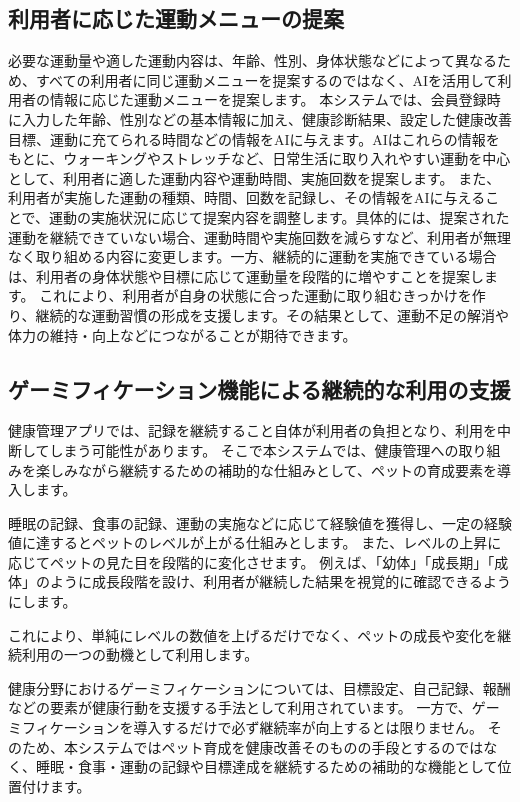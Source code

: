 \documentclass[uplatex,dvipdfmx]{jlreq}
\begin{document}
\subsection{利用者に応じた運動メニューの提案}
必要な運動量や適した運動内容は、年齢、性別、身体状態などによって異なるため、すべての利用者に同じ運動メニューを提案するのではなく、AIを活用して利用者の情報に応じた運動メニューを提案します。
本システムでは、会員登録時に入力した年齢、性別などの基本情報に加え、健康診断結果、設定した健康改善目標、運動に充てられる時間などの情報をAIに与えます。AIはこれらの情報をもとに、ウォーキングやストレッチなど、日常生活に取り入れやすい運動を中心として、利用者に適した運動内容や運動時間、実施回数を提案します。
また、利用者が実施した運動の種類、時間、回数を記録し、その情報をAIに与えることで、運動の実施状況に応じて提案内容を調整します。具体的には、提案された運動を継続できていない場合、運動時間や実施回数を減らすなど、利用者が無理なく取り組める内容に変更します。一方、継続的に運動を実施できている場合は、利用者の身体状態や目標に応じて運動量を段階的に増やすことを提案します。
これにより、利用者が自身の状態に合った運動に取り組むきっかけを作り、継続的な運動習慣の形成を支援します。その結果として、運動不足の解消や体力の維持・向上などにつながることが期待できます。


\subsection{ゲーミフィケーション機能による継続的な利用の支援}
健康管理アプリでは、記録を継続すること自体が利用者の負担となり、利用を中断してしまう可能性があります。
そこで本システムでは、健康管理への取り組みを楽しみながら継続するための補助的な仕組みとして、ペットの育成要素を導入します。

睡眠の記録、食事の記録、運動の実施などに応じて経験値を獲得し、一定の経験値に達するとペットのレベルが上がる仕組みとします。
また、レベルの上昇に応じてペットの見た目を段階的に変化させます。
例えば、「幼体」「成長期」「成体」のように成長段階を設け、利用者が継続した結果を視覚的に確認できるようにします。

これにより、単純にレベルの数値を上げるだけでなく、ペットの成長や変化を継続利用の一つの動機として利用します。

健康分野におけるゲーミフィケーションについては、目標設定、自己記録、報酬などの要素が健康行動を支援する手法として利用されています。
一方で、ゲーミフィケーションを導入するだけで必ず継続率が向上するとは限りません。
そのため、本システムではペット育成を健康改善そのものの手段とするのではなく、睡眠・食事・運動の記録や目標達成を継続するための補助的な機能として位置付けます。
\end{document}
